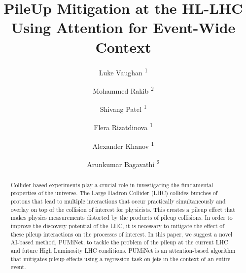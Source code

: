 \documentclass[runningheads]{llncs}
\newcommand{\myname}{PUMiNet}
\begin{document}
%
\title{PileUp Mitigation at the HL-LHC\\ Using Attention for Event-Wide Context}
%
%

  \author{Luke Vaughan \textsuperscript{1} \and
  Mohammed Rakib \textsuperscript{2} \and
  Shivang Patel \textsuperscript{1} \and
  Flera Rizatdinova \textsuperscript{1} \and
  Alexander Khanov \textsuperscript{1} \and
  Arunkumar Bagavathi \textsuperscript{2}%
  }





\maketitle              %
%
\begin{abstract}
Collider-based experiments play a crucial role in investigating the fundamental properties of the universe. The Large Hadron Collider (LHC) collides bunches of protons that lead to multiple interactions that occur practically simultaneously and overlay on top of the collision of interest for physicists. This creates a pileup effect that makes physics measurements distorted by the products of pileup collisions. In order to improve the discovery potential of the LHC, it is necessary to mitigate the effect of these pileup interactions on the processes of interest. In this paper, we suggest a novel AI-based method, \myname{}, to tackle the problem of the pileup at the current LHC and future High Luminosity LHC conditions. \myname{} is an attention-based algorithm that mitigates pileup effects using a regression task on jets in the context of an entire event.

\end{abstract}
%
%
%

\end{document}
